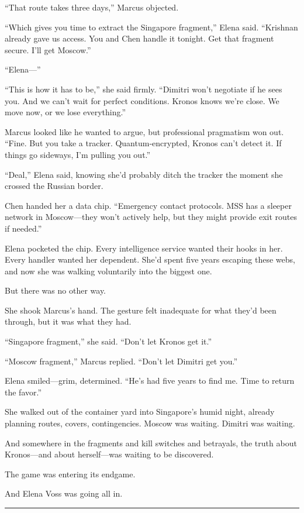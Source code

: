 ``That route takes three days,'' Marcus objected.

``Which gives you time to extract the Singapore fragment,'' Elena said. ``Krishnan already gave us access. You and Chen handle it tonight. Get that fragment secure. I'll get Moscow.''

``Elena---''

``This is how it has to be,'' she said firmly. ``Dimitri won't negotiate if he sees you. And we can't wait for perfect conditions. Kronos knows we're close. We move now, or we lose everything.''

Marcus looked like he wanted to argue, but professional pragmatism won out. ``Fine. But you take a tracker. Quantum-encrypted, Kronos can't detect it. If things go sideways, I'm pulling you out.''

``Deal,'' Elena said, knowing she'd probably ditch the tracker the moment she crossed the Russian border.

Chen handed her a data chip. ``Emergency contact protocols. MSS has a sleeper network in Moscow---they won't actively help, but they might provide exit routes if needed.''

Elena pocketed the chip. Every intelligence service wanted their hooks in her. Every handler wanted her dependent. She'd spent five years escaping these webs, and now she was walking voluntarily into the biggest one.

But there was no other way.

She shook Marcus's hand. The gesture felt inadequate for what they'd been through, but it was what they had.

``Singapore fragment,'' she said. ``Don't let Kronos get it.''

``Moscow fragment,'' Marcus replied. ``Don't let Dimitri get you.''

Elena smiled---grim, determined. ``He's had five years to find me. Time to return the favor.''

She walked out of the container yard into Singapore's humid night, already planning routes, covers, contingencies. Moscow was waiting. Dimitri was waiting.

And somewhere in the fragments and kill switches and betrayals, the truth about Kronos---and about herself---was waiting to be discovered.

The game was entering its endgame.

And Elena Voss was going all in.

\begin{center}\rule{0.5\linewidth}{0.5pt}\end{center}

